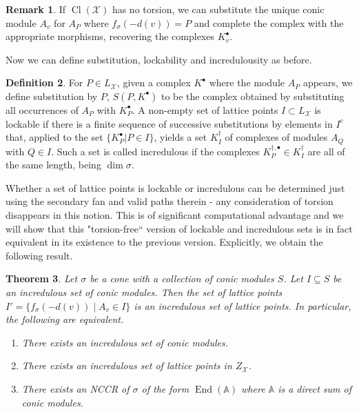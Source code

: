 \documentclass[reqno, 12pt]{amsart}
\newtheorem{theorem}{Theorem}[section]
\theoremstyle{definition}
\newtheorem{definition}[theorem]{Definition}
\newtheorem{remark}[theorem]{Remark}
\numberwithin{equation}{section}
\newcommand{\newterm}{\textsf}
\newcommand{\End}{\operatorname{End}}
\begin{document}
\begin{remark}
    If $\operatorname{Cl}(\mathcal{X})$ has no torsion, we can substitute the unique conic module $A_v$ for $A_P$ where $f_\sigma(-d(v))=P$ and complete the complex with the appropriate morphisms, recovering the complexes $K_v^\bullet$.
\end{remark}

Now we can define substitution, lockability and incredulousity as before.

\begin{definition}
    \label{Def:IncPtSet}
    For $P\in L_\mathcal{X}$, given a complex $K^\bullet$ where the module $A_P$ appears, we define \newterm{substitution by $P$}, $S(P,K^\bullet)$ to be the complex obtained by substituting all occurrences of $A_P$ with $K_P^\bullet$. 
    A non-empty set of lattice points $I\subset L_\mathcal{X}$ is \newterm{lockable} if there is a finite sequence of successive substitutions by elements in $I^c$ that, applied to the set $\{K_P^\bullet\vert P\in I\}$, yields a set $K_I^\dagger$ of complexes of modules $A_Q$ with $Q\in I$. Such a set is called incredulous if the complexes $K_P^{\dagger,\bullet}\in K_I^\dagger$ are all of the same length, being $\dim\sigma$.
\end{definition}

Whether a set of lattice points is lockable or incredulous can be determined just using the secondary fan and valid paths therein - any consideration of torsion disappears in this notion. This is of significant computational advantage and we will show that this "torsion-free`` version of lockable and incredulous sets is in fact equivalent in its existence to the previous version. Explicitly, we obtain the following result.


\begin{theorem}
    \label{Thm:Incr definitions agree}
    Let $\sigma$ be a cone with a collection of conic modules $S$. Let $I\subseteq S$ be an incredulous set of conic modules. Then the set of lattice points $I'=\{f_\sigma(-d(v))\mid A_v\in I\}$ is an incredulous set of lattice points. In particular, the following are equivalent.
    \begin{enumerate}
        \item There exists an incredulous set of conic modules.
        \item There exists an incredulous set of lattice points in $Z_\mathcal{X}$.
        \item There exists an NCCR of $\sigma$ of the form $\End(\mathbb{A})$ where $\mathbb{A}$ is a direct sum of conic modules.
    \end{enumerate}
\end{theorem}
\end{document}

